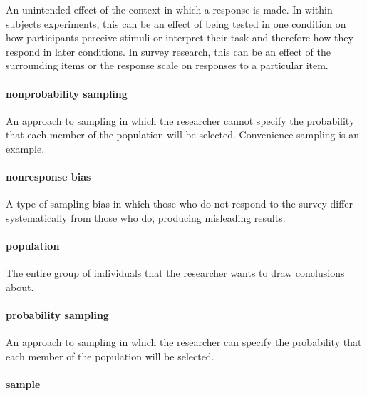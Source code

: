 \documentclass[
]{krantz}
\begin{document}
An unintended effect of the context in which a response is made. In within-subjects experiments, this can be an effect of being tested in one condition on how participants perceive stimuli or interpret their task and therefore how they respond in later conditions. In survey research, this can be an effect of the surrounding items or the response scale on responses to a particular item.

\hypertarget{nonprobability-sampling}{%
\paragraph*{nonprobability sampling}\label{nonprobability-sampling}}

An approach to sampling in which the researcher cannot specify the probability that each member of the population will be selected. Convenience sampling is an example.

\hypertarget{nonresponse-bias}{%
\paragraph*{nonresponse bias}\label{nonresponse-bias}}

A type of sampling bias in which those who do not respond to the survey differ systematically from those who do, producing misleading results.

\hypertarget{population-1}{%
\paragraph*{population}\label{population-1}}

The entire group of individuals that the researcher wants to draw conclusions about.

\hypertarget{probability-sampling}{%
\paragraph*{probability sampling}\label{probability-sampling}}

An approach to sampling in which the researcher can specify the probability that each member of the population will be selected.

\hypertarget{sample-1}{%
\paragraph*{sample}\label{sample-1}}
\end{document}
